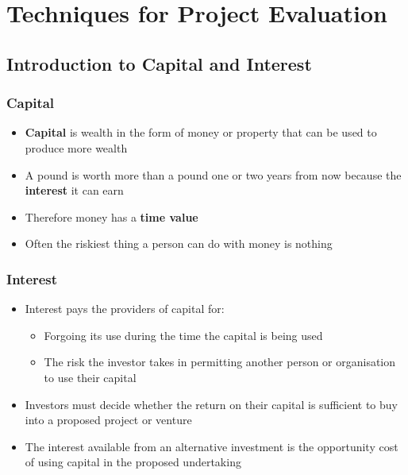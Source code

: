 \chapter{Techniques for Project Evaluation}
\section{Introduction to Capital and Interest}
\subsection{Capital}
\begin{itemize}
  \item \textbf{Capital} is wealth in the form of money or property that can be used to produce more wealth
  \item A pound is worth more than a pound one or two years from now because the \textbf{interest} it can earn
  \item Therefore money has a \textbf{time value}
  \item Often the riskiest thing a person can do with money is nothing
\end{itemize}
\subsection{Interest}
\begin{itemize}
  \item Interest pays the providers of capital for:
        \begin{itemize}
          \item Forgoing its use during the time the capital is being used
          \item The risk the investor takes in permitting another person or organisation to use their capital
        \end{itemize}
  \item Investors must decide whether the return on their capital is sufficient to buy into a proposed project or venture
  \item The interest available from an alternative investment is the opportunity cost of using capital in the proposed undertaking
\end{itemize}
